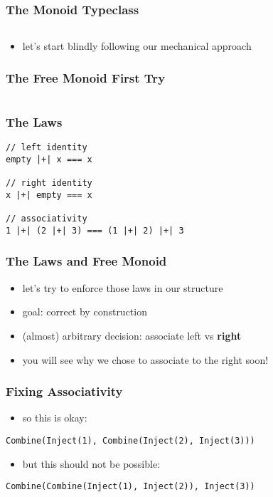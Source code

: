 \documentclass{beamer}
\begin{document}
\begin{frame}
  \frametitle{The Monoid Typeclass}
  \inputminted{scala}{snippets/monoid-typeclass.scala}
  \begin{itemize}
  \item let's start blindly following our mechanical approach
  \end{itemize}
\end{frame}

\begin{frame}
  \frametitle{The Free Monoid \textemdash{} First Try}
  \inputminted{scala}{snippets/free-monoid-1.scala}
\end{frame}

\begin{frame}[fragile]
  \frametitle{The Laws}
  \begin{verbatim}
// left identity
empty |+| x === x

// right identity
x |+| empty === x

// associativity
1 |+| (2 |+| 3) === (1 |+| 2) |+| 3
  \end{verbatim}
\end{frame}

\begin{frame}
  \frametitle{The Laws and Free Monoid}
  \begin{itemize}
  \item let's try to enforce those laws in our structure
  \item goal: correct by construction
  \item (almost) arbitrary decision: associate left vs \textbf{right}
  \item you will see why we chose to associate to the right soon!
  \end{itemize}
\end{frame}

\begin{frame}[fragile]
  \frametitle{Fixing Associativity}

  \begin{itemize}
  \item so this is okay:
  \end{itemize}

\begin{verbatim}
Combine(Inject(1), Combine(Inject(2), Inject(3)))
\end{verbatim}

\begin{itemize}
\item but this should not be possible:
\end{itemize}

\begin{verbatim}
Combine(Combine(Inject(1), Inject(2)), Inject(3))
\end{verbatim}
\end{frame}
\end{document}

